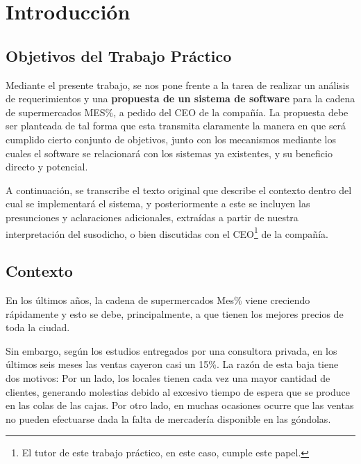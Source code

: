\documentclass[11pt, a4paper, twoside]{article}
\begin{document}
\clearpage{\pagestyle{empty}}

\clearpage{%
  \pagestyle{empty}\tableofcontents%
  \vspace{3cm}%
  \cleardoublepage%
}

\setcounter{page}{1}

\section{Introducción}

  \subsection{Objetivos del Trabajo Práctico}

Mediante el presente trabajo, se nos pone frente a la tarea de realizar un
análisis de requerimientos y una \textbf{propuesta de un sistema de software}
para la cadena de supermercados MES\%, a pedido del CEO de la compañía. La
propuesta debe ser planteada de tal forma que esta transmita claramente la
manera en que será cumplido cierto conjunto de objetivos, junto con los
mecanismos mediante los cuales el software se relacionará con los sistemas ya
existentes, y su beneficio directo y potencial.

A continuación, se transcribe el texto original que describe el contexto dentro
del cual se implementará el sistema, y posteriormente a este se incluyen las
presunciones y aclaraciones adicionales, extraídas a partir de nuestra
interpretación del susodicho, o bien discutidas con el CEO\footnote{El tutor de
este trabajo práctico, en este caso, cumple este papel.} de la compañía.

  \subsection{Contexto}

  En los últimos años, la cadena de supermercados Mes\% viene creciendo
rápidamente y esto se debe, principalmente, a que tienen los mejores precios de
toda la ciudad.

  Sin embargo, según los estudios entregados por una consultora privada, en los
últimos seis meses las ventas cayeron casi un 15\%. La razón de esta baja tiene
dos motivos: Por un lado, los locales tienen cada vez una mayor cantidad de
clientes, generando molestias debido al excesivo tiempo de espera que se produce
en las colas de las cajas. Por otro lado, en muchas ocasiones ocurre que las
ventas no pueden efectuarse dada la falta de mercadería disponible en las
góndolas.
\end{document}
